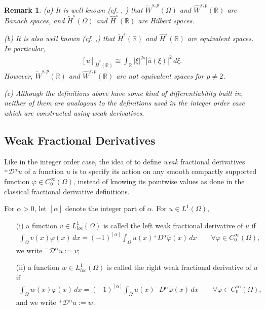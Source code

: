\documentclass[leqno,final]{siamltex}
\numberwithin{equation}{section}
\newtheorem{remark}{Remark}[section]
\renewcommand{\(}{\bigl(}
\renewcommand{\)}{\bigr)}
\newcommand{\tH}{\widetilde{H}}
\newcommand{\tW}{\widetilde{W}}
\newcommand{\R}{\mathbb{R}}
\begin{document}
\begin{remark}
(a) It is well known (cf. \cite{Adams}, \cite{Nezza}) that  ${\tW}^{s,p}(\Omega)$ and $\widehat{W}^{s,p}(\R)$ are Banach spaces,
	and ${\tH}^{s}(\Omega)$ and  $\widehat{H}^{s}(\R)$ are Hilbert spaces.  
	
(b) It is also well known (cf. \cite{Adams},\cite{Nezza}) that ${{\tH}^{s}(\R)}$ and $\widehat{H}^{s}(\R)$ are equivalent spaces. In particular,
\begin{align}\label{SeminormRelation}
    [u]_{{\tH}^{s}(\R)} \cong \int_{\R} |\xi|^{2 s} |\hat{ u}(\xi)|^{2}\,d\xi.
\end{align}
However, ${{\tW}^{s,p}(\R)}$ and $\widehat{W}^{s,p}(\R)$ are not equivalent spaces for $p \neq 2$. 

(c) Although the definitions above have some kind of differentiability built in, neither of 
them are analogous to the definitions used in the integer order case which are constructed 
using weak derivatives.
\end{remark}

\subsection{Weak Fractional Derivatives}\label{sec-2.2}
Like in the integer order case, the idea of \cite{Feng_Sutton,Feng_Sutton1} to define {\em weak} fractional derivatives ${^{\pm}}{ \mathcal{D}}{^{\alpha}} u$ of a function $u$ is to specify its action on any smooth compactly supported function $\varphi \in C^{\infty}_{0}(\Omega)$, 
instead of knowing its pointwise values as done in the classical fractional 
derivative definitions.

\begin{definition}\label{RWFD}
	For $\alpha> 0$, let $[\alpha]$ denote the integer part of $\alpha$. For $u \in L^{1}(\Omega)$, 
	\begin{itemize} 
		\item[{\rm (i)}] a function $v \in L_{loc}^{1} (\Omega)$ is called the left weak fractional derivative of $u$ if 
		\begin{align*}
		\int_{\Omega} v(x) \varphi(x) \,dx = (-1)^{[\alpha]} \int_{\Omega} u(x) {^{+}}{D}{^{\alpha}} \tilde{\varphi}(x) \, dx
		\qquad \forall \varphi \in C_{0}^{\infty} (\Omega),
		\end{align*}
		we write ${^{-}}{ \mathcal{D}}{^{\alpha}} u:=v$; 
		\item[{\rm (ii)}] a function $w\in L_{loc}^{1} (\Omega)$ is called the right weak fractional derivative of $u$ if 
		\begin{align*}
		\int_{\Omega} w(x) \varphi(x) \,dx = (-1)^{[\alpha]} \int_{\Omega} u(x) {^{-}}{D}{}^{\alpha} \tilde{\varphi}(x) \,dx
		\qquad \forall \varphi \in C_{0}^{\infty} (\Omega), 
		\end{align*}
		and we write ${^{+}}{\mathcal{D}}{^{\alpha}} u:=w$. 
	\end{itemize}
\end{definition}
\end{document}
